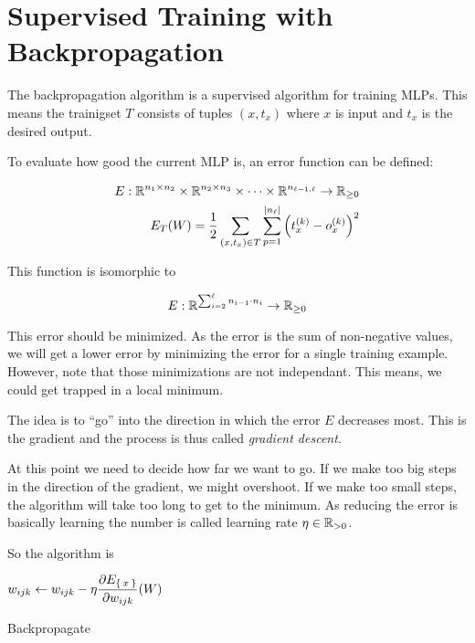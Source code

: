 \section{Supervised Training with Backpropagation}\label{sec:training}
The backpropagation algorithm is a supervised algorithm for training
\glspl{MLP}. This means the trainigset $T$ consists of tuples $(x, t_x)$
where $x$ is input and $t_x$ is the desired output.

To evaluate how good the current \gls{MLP} is, an error function can be defined:

\begin{align*}
    E: \mathbb{R}^{n_1 \times n_2} \times \mathbb{R}^{n_2 \times n_3} \times \dots \times \mathbb{R}^{n_{{\ell}-1, {\ell}}} \rightarrow \mathbb{R}_{\geq 0}\\
    E_T(W) = \frac{1}{2} \sum_{(x, t_x) \in T} \sum_{p = 1}^{|n_{\ell}|} \left (t_{x}^{(k)} - o_{x}^{(k)} \right )^2
\end{align*}

This function is isomorphic to 

\[E: \mathbb{R}^{\sum_{i=2}^{\ell} n_{i-1} \cdot n_{i}} \rightarrow \mathbb{R}_{\geq 0}\]

This error should be minimized. As the error is the sum of non-negative values,
we will get a lower error by minimizing the error for a single training example.
However, note that those minimizations are not independant. This means, we could
get trapped in a local minimum.

The idea is to \enquote{go} into the direction in which the error $E$ decreases
most. This is the gradient and the process is thus called \textit{gradient descent}.

At this point we need to decide how far we want to go. If we make too big steps
in the direction of the gradient, we might overshoot. If we make too small steps,
the algorithm will take too long to get to the minimum. As reducing the error
is basically learning the number is called learning rate $\eta \in \mathbb{R}_{> 0}$.

So the algorithm is

\begin{algorithm}[h]
    \begin{algorithmic}
                            \State $\displaystyle w_{ijk} \gets w_{ijk} - \eta \frac{\partial E_{\Set{x}}}{\partial w_{ijk}} (W)$
                        \EndFor
                    \EndFor
                \EndFor
            \EndWhile
        \EndFunction
    \end{algorithmic}
\caption{Backpropagate}
\label{alg:backpropagate}
\end{algorithm}

